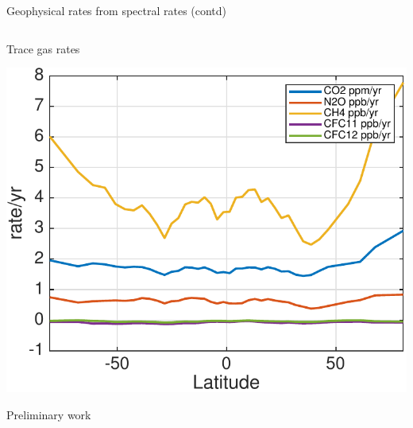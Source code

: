 \documentclass[10pt,t]{beamer}
\begin{document}
\begin{frame}{Geophysical rates from spectral rates (contd)}
\begin{columns}
\begin{column}{0.55\columnwidth}
\begin{block}{\footnotesize Trace gas rates}
\vspace{-0.1in}
\begin{center}
\includegraphics[width=\linewidth]{Figs/CloudAnom/Desc_ocean/tracegas_lat_rates_from_obs_specral_rates.pdf}
\end{center}
\footnotesize
Preliminary work
\end{block}
\end{column}
\end{columns}
\end{frame}


\end{document}
